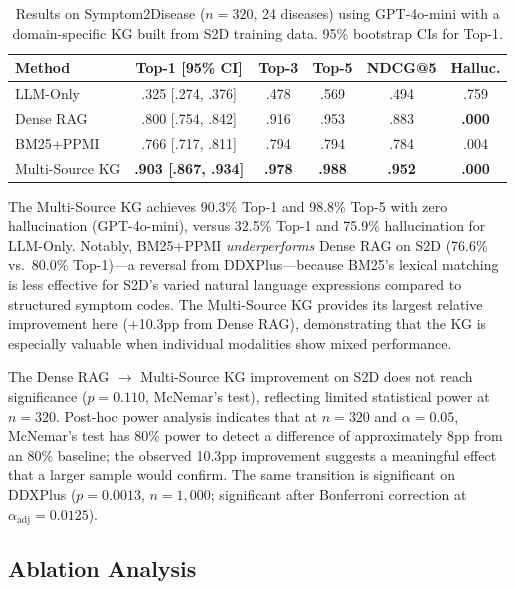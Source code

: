\documentclass[runningheads]{llncs}
\begin{document}
\begin{table}[t]
\centering
\caption{Results on Symptom2Disease ($n{=}320$, 24 diseases) using GPT-4o-mini with a domain-specific KG built from S2D training data. 95\% bootstrap CIs for Top-1.}
\label{tab:s2d}
\begin{tabular}{lccccc}
\toprule
\textbf{Method} & \textbf{Top-1 [95\% CI]} & \textbf{Top-3} & \textbf{Top-5} & \textbf{NDCG@5} & \textbf{Halluc.} \\
\midrule
LLM-Only       & .325 [.274, .376] & .478 & .569 & .494 & .759 \\
Dense RAG       & .800 [.754, .842] & .916 & .953 & .883 & \textbf{.000} \\
BM25+PPMI       & .766 [.717, .811] & .794 & .794 & .784 & .004 \\
Multi-Source KG & \textbf{.903 [.867, .934]} & \textbf{.978} & \textbf{.988} & \textbf{.952} & \textbf{.000} \\
\bottomrule
\end{tabular}
\end{table}

The Multi-Source KG achieves 90.3\% Top-1 and 98.8\% Top-5 with zero hallucination (GPT-4o-mini), versus 32.5\% Top-1 and 75.9\% hallucination for LLM-Only. Notably, BM25+PPMI \emph{underperforms} Dense RAG on S2D (76.6\% vs.\ 80.0\% Top-1)---a reversal from DDXPlus---because BM25's lexical matching is less effective for S2D's varied natural language expressions compared to structured symptom codes. The Multi-Source KG provides its largest relative improvement here (+10.3pp from Dense RAG), demonstrating that the KG is especially valuable when individual modalities show mixed performance.

The Dense RAG $\rightarrow$ Multi-Source KG improvement on S2D does not reach significance ($p{=}0.110$, McNemar's test), reflecting limited statistical power at $n{=}320$. Post-hoc power analysis indicates that at $n{=}320$ and $\alpha{=}0.05$, McNemar's test has 80\% power to detect a difference of approximately 8pp from an 80\% baseline; the observed 10.3pp improvement suggests a meaningful effect that a larger sample would confirm. The same transition is significant on DDXPlus ($p{=}0.0013$, $n{=}1{,}000$; significant after Bonferroni correction at $\alpha_{\text{adj}}{=}0.0125$).

\subsection{Ablation Analysis}
\label{sec:ablation}
\end{document}
